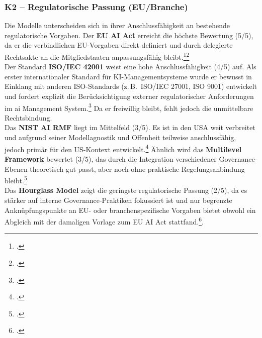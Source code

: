 \subsubsection{K2 – Regulatorische Passung (EU/Branche)}
Die Modelle unterscheiden sich in ihrer Anschlussfähigkeit an bestehende regulatorische Vorgaben. 
Der \textbf{EU AI Act} erreicht die höchste Bewertung (5/5), da er die verbindlichen EU-Vorgaben direkt definiert und durch delegierte Rechtsakte an die Mitgliedstaaten anpassungsfähig bleibt.\footcite[][2-3]{kimAIGovernanceContext2025}\footcite[2-3]{europeanparliamentaryresearchserviceArtificialIntelligenceAct2024}
\\
Der Standard \textbf{ISO/IEC 42001} weist eine hohe Anschlussfähigkeit (4/5) auf. 
Als erster internationaler Standard für KI-Managementsysteme wurde er bewusst in Einklang mit anderen ISO-Standards (z.\,B.\ ISO/IEC 27001, ISO 9001) entwickelt und fordert explizit die Berücksichtigung externer regulatorischer Anforderungen im \ac{ai} Management System.\footcite[][S.~vi--vii, S.~5]{isoISOIEC42001}
Da er freiwillig bleibt, fehlt jedoch die unmittelbare Rechtsbindung.
\\
Das \textbf{NIST AI RMF} liegt im Mittelfeld (3/5). Es ist in den USA weit verbreitet und aufgrund seiner Modellagnostik und Offenheit teilweise anschlussfähig, jedoch primär für den US-Kontext entwickelt.\footcite[][]{nationalinstituteofstandardsandtechnologyAIRiskManagement2021}
Ähnlich wird das \textbf{Multilevel Framework} bewertet (3/5), das durch die Integration verschiedener Governance-Ebenen theoretisch gut passt, aber noch ohne praktische Regelungsanbindung bleibt.\footcite[][]{choungMultilevelFrameworkAI2023}
\\
Das \textbf{Hourglass Model} zeigt die geringste regulatorische Passung (2/5), da es stärker auf interne Governance-Praktiken fokussiert ist und nur begrenzte Anknüpfungspunkte an EU- oder branchenspezifische Vorgaben bietet obwohl ein Abgleich mit der damaligen Vorlage zum EU AI Act stattfand.\footcite[][]{mantymakiPDFPuttingAI2025}.  

